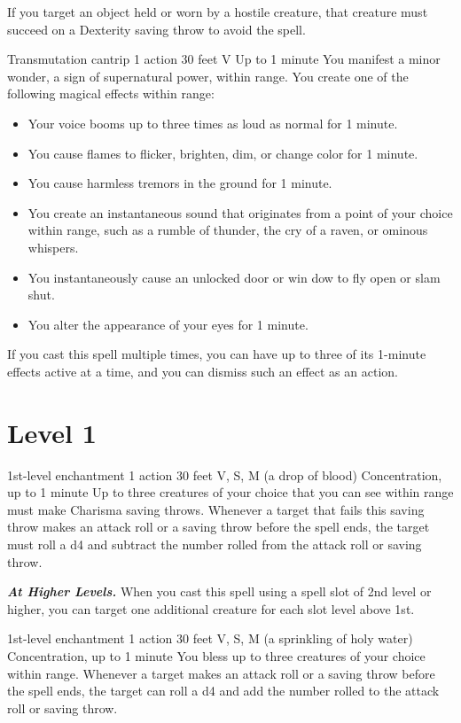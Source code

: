 \documentclass[10pt,twoside,twocolumn,openany]{book}
\newcommand\impact[1]{
	\textbf{\textit{#1}}
}
\begin{document}
If you target an object held or worn by a hostile creature, that creature 
must succeed on a Dexterity saving throw to avoid the spell.

{Transmutation cantrip}
{\color{action} 1 action}
{30 feet}
{V}
{Up to 1 minute}
%
You manifest a minor wonder, a sign of supernatural power, within range. You create one of the following magical effects within range:
\begin{itemize}
	\item Your voice booms up to three times as loud as normal for 1 minute.
	\item You cause flames to flicker, brighten, dim, or change color for 1 minute.
	\item You cause harmless tremors in the ground for 1 minute.
	\item You create an instantaneous sound that originates from a point of your choice within range, such as a rumble of thunder, the cry of a raven, or ominous whispers.
	\item You instantaneously cause an unlocked door or win  dow to fly open or slam shut.
	\item You alter the appearance of your eyes for 1 minute.
\end{itemize}
If you cast this spell multiple times, you can have up to three of its 1-minute effects active at a time, and you can dismiss such an effect as an action.

\newpage
\section{Level 1}
{1st-level enchantment}
{\color{action} 1 action}
{30 feet}
{V, S, M (a drop of blood)}
{{\color{concentration}Concentration}, up to 1 minute}
%
Up to three creatures of your choice that you can see within range must make Charisma saving throws. Whenever a target that fails this saving throw makes an attack roll or a saving throw before the spell ends, the target must roll a d4 and subtract the number rolled from the attack roll or saving throw.

\impact{At Higher Levels.} When you cast this spell using a spell slot of 2nd level or higher, you can target one additional creature for each slot level above 1st.

{1st-level enchantment}
{\color{action} 1 action}
{30 feet}
{V, S, M (a sprinkling of holy water)}
{{\color{concentration}Concentration}, up to 1 minute}
%
You bless up to three creatures of your choice within range. Whenever a target makes an attack roll or a saving throw before the spell ends, the target can roll a d4 and add the number rolled to the attack roll or saving throw.
\end{document}
